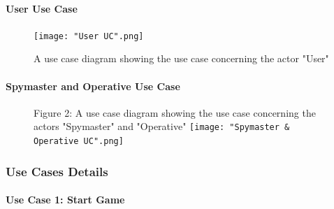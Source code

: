 \documentclass[10pt, a4paper]{article}
\begin{document}
	\paragraph{User Use Case}
	
	\begin{center}
		\begin{figure}[H]
			\caption{A use case diagram showing the use case concerning the actor "User"}
			\texttt{[image: "User UC".png]}
		\end{figure}
	\end{center} 
	
	\newpage
	
	\paragraph{Spymaster and Operative Use Case}
	
	\begin{center}
		\begin{figure}[H]
			Figure 2: A use case diagram showing the use case concerning the actors "Spymaster" and "Operative"
			\texttt{[image: "Spymaster \& Operative UC".png]}
		\end{figure}
	\end{center}
	
	
	\subsubsection{Use Cases Details}
	
	\paragraph{Use Case 1: Start Game }
	
\end{document}

